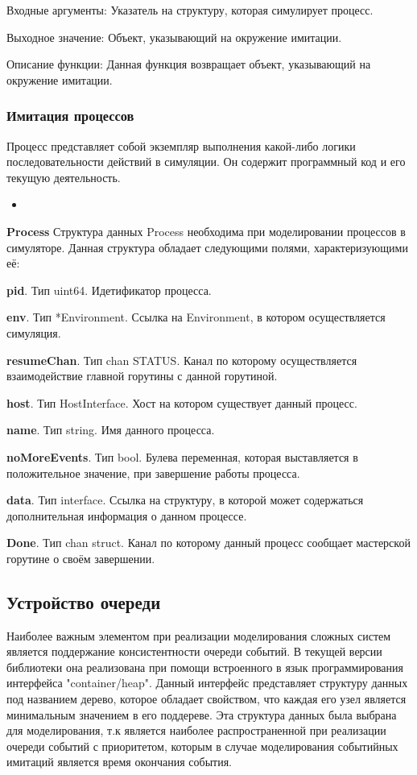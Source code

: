 Входные аргументы: Указатель на структуру, которая симулирует процесс.

Выходное значение: Объект, указывающий на окружение имитации.

Описание функции: Данная функция возвращает объект, указывающий на окружение имитации.

\subsubsection{Имитация процессов}
\par 
Процесс представляет собой экземпляр выполнения какой-либо логики последовательности действий в симуляции. Он содержит программный код и его текущую деятельность.
\begin{itemize}
	\item 
\end{itemize}

\textbf{Process}
Структура данных Process необходима при моделировании процессов в симуляторе. Данная структура обладает следующими полями, характеризующими  её:

\textbf{	pid}. Тип uint64. Идетификатор процесса. 

\textbf{	env}. Тип        *Environment. Ссылка на Environment, в котором осуществляется симуляция. 

\textbf{	resumeChan}. Тип chan STATUS. Канал по которому осуществляется взаимодействие главной горутины с данной горутиной. 

\textbf{	host}. Тип       HostInterface. Хост на котором существует данный процесс. 

\textbf{	name}. Тип         string. Имя данного процесса. 

\textbf{	noMoreEvents}. Тип bool. Булева переменная, которая выставляется в положительное значение, при завершение работы процесса.

\textbf{	data}. Тип         interface. Ссылка на  структуру, в  которой может содержаться дополнительная информация о данном процессе.

\textbf{	Done}. Тип chan struct. Канал по которому данный процесс сообщает мастерской горутине о своём завершении. 

\subsection{Устройство очереди}

Наиболее важным элементом при реализации моделирования сложных систем является поддержание консистентности очереди событий. В текущей версии библиотеки она реализована при помощи встроенного в язык программирования интерфейса "container/heap". Данный интерфейс представляет структуру данных под названием дерево, которое обладает свойством, что каждая его узел является минимальным значением в его поддереве. Эта структура данных была выбрана для моделирования, т.к является наиболее распространенной при реализации очереди событий с приоритетом, которым в случае моделирования событийных имитаций является время окончания события. 

